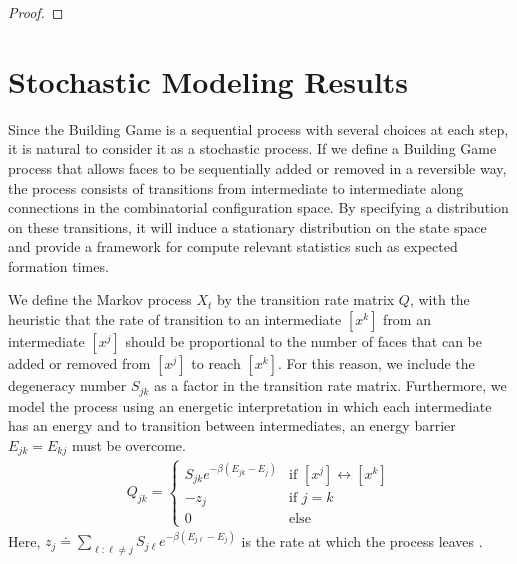 \begin{proof}
\end{proof}


\section{Stochastic Modeling Results}

Since the Building Game is a sequential process with several choices at each step, it is natural to consider it as a stochastic process. If we define a Building Game process that allows faces to be sequentially added or removed in a reversible way, the process consists of transitions from intermediate to intermediate along connections in the combinatorial configuration space. By specifying a distribution on these transitions, it will induce a stationary distribution on the state space and provide a framework for compute relevant statistics such as expected formation times.





We define the Markov process $X_t$ by the transition rate matrix $Q$, with the heuristic that the rate of transition to an intermediate $[x^k]$ from an intermediate $[x^j]$ should be proportional to the number of faces that can be added or removed from $[x^j]$ to reach $[x^k]$. For this reason, we include the degeneracy number $S_{jk}$ as a factor in the transition rate matrix. Furthermore, we model the process using an energetic interpretation in which each intermediate has an energy and to transition between intermediates, an energy barrier $E_{jk} = E_{kj}$ must be overcome. 
\begin{align}
  \label{eq:Qdef}
  Q_{jk} =
  \begin{cases}
   S_{jk}e^{-\beta\left(E_{jk} - E_{j}\right)} & \text{if } [x^j] \leftrightarrow [x^k]  \\
   -z_j       & \text{if } j = k \\
   0 & \text{else}
  \end{cases}
\end{align}
Here, $z_j \doteq \sum_{\ell: \ell \neq j} S_{j\ell}e^{-\beta\left(E_{j\ell} - E_j\right)}$ is the rate at which the process leaves \xj. 

